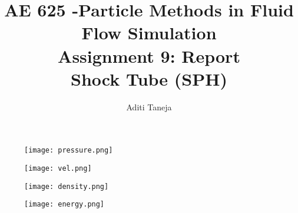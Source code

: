 \documentclass{article}
\title{AE 625 -Particle Methods in Fluid Flow Simulation \\ Assignment 9: Report \\ Shock Tube (SPH)}
\author{Aditi Taneja}
\date{}
\begin{document}
\maketitle

\begin{figure}[H]   \label{figure}
\texttt{[image: pressure.png]}
\label{figure:}
\end{figure}

\begin{figure}[H] \label{figure}
\texttt{[image: vel.png]}
\label{figure:}
\end{figure}

\begin{figure}[H] \label{figure}
\texttt{[image: density.png]}
\label{figure:}
\end{figure}

\begin{figure}[H] \label{figure}
\texttt{[image: energy.png]}
\label{figure:}
\end{figure}
\end{document}
